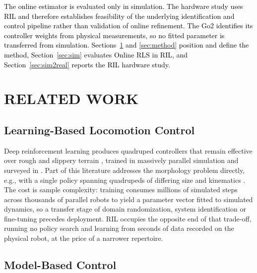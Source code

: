 \documentclass[a4paper, 10pt, conference]{ieeeconf}
\newcommand{\oldtext}[1]{\textcolor{red}{}}
\newcommand{\newtext}[1]{\textcolor{black}{#1}}
\begin{document}
\newtext{The online estimator is evaluated only in simulation. The hardware study
uses RIL and therefore establishes feasibility of the underlying
identification and control pipeline rather than validation of online refinement.
The Go2 identifies its controller weights from physical measurements, so no fitted
parameter is transferred from simulation. Sections~\ref{sec:related} and \ref{sec:method}
position and define the method, Section~\ref{sec:sim} evaluates
Online RLS in RIL, and Section~\ref{sec:sim2real} reports the RIL
hardware study.}

\section{RELATED WORK}
\label{sec:related}

\subsection{Learning-Based Locomotion Control}

Deep reinforcement learning produces quadruped controllers that remain effective over
rough and slippery terrain \cite{hwangbo2019,lee2020}, trained in massively
parallel simulation \cite{rudin2022,makoviychuk2021} and surveyed in
\cite{ha2025}. Part of this literature addresses the morphology problem directly,
e.g., with a single policy spanning quadrupeds of differing size and
kinematics \cite{shafiee2024,zargarbashi2024}.
The cost is sample complexity: training consumes millions of simulated steps
across thousands of parallel robots to yield a parameter vector fitted
to simulated dynamics, so a transfer stage of domain randomization, system
identification or fine-tuning precedes deployment. RIL occupies the opposite end
of that trade-off, running no policy search and learning from seconds of data
recorded on the physical robot, at the price of a narrower repertoire.

\subsection{Model-Based Control}

\end{document}

